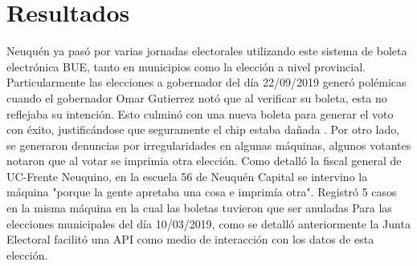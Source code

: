 \section{Resultados}
Neuquén ya pasó por varias jornadas electorales utilizando este sistema de boleta electrónica BUE, tanto en municipios como la elección a nivel provincial. Particularmente las elecciones a gobernador del día 22/09/2019 generó polémicas cuando el gobernador Omar Gutierrez notó que al verificar su boleta, esta no reflejaba su intención. Esto culminó con una nueva boleta para generar el voto con éxito, justificándose que seguramente el chip estaba dañada \cite{errorOmarGutierrez}.  Por otro lado, se generaron denuncias por irregularidades en algunas máquinas, algunos votantes notaron que al votar se imprimia otra elección. Como detalló la fiscal general de UC-Frente Neuquino, en la escuela 56 de Neuquén Capital se intervino la máquina "porque la gente apretaba una cosa e imprimía otra". Registró 5 casos en la misma máquina en la cual las boletas tuvieron que ser anuladas \cite{errorNeuquen} \newline
Para las elecciones municipales del día 10/03/2019, como se detalló anteriormente la Junta Electoral facilitó una API como medio de interacción con los datos de esta elección. 